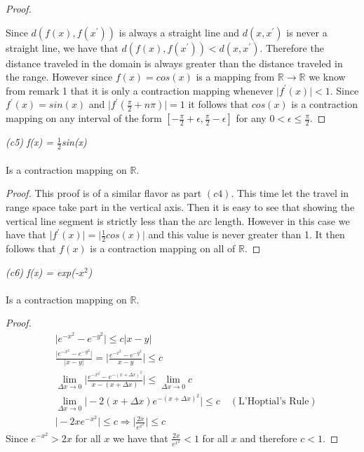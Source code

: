 \documentclass[12pt]{article}
\theoremstyle{remark}
\begin{document}
\begin{proof}
\begin{center}
 		\end{center}
 		Since $d(f(x),f(x^\prime))$ is always a straight line and $d(x,x^\prime)$ is never a straight line, we have that $d(f(x),f(x^\prime)) < d(x,x^\prime)$. Therefore the distance traveled in the domain is always greater than the distance traveled in the range. However since $f(x) = cos(x)$ is a mapping from $\mathbb{R} \rightarrow \mathbb{R}$ we know from remark 1 that it is only a contraction mapping whenever $\vert f^\prime(x) \vert < 1$. Since $f^\prime(x) = sin(x)$ and $\vert f^\prime(\frac{\pi}{2} + n\pi) \vert = 1$ it follows that $cos(x)$ is a contraction mapping on any interval of the form $[-\frac{\pi}{2} + \epsilon, \frac{\pi}{2} - \epsilon]$ for any $0 < \epsilon \leq \frac{\pi}{2}$.
 	\end{proof}
 	\noindent \textit{(c5) f(x) = $\frac{1}{2}$sin(x)} \\ \\
 	Is a contraction mapping on $\mathbb{R}$.
 	\begin{proof}
 		This proof is of a similar flavor as part $(c4)$. This time let the travel in range space take part in the vertical axis. Then it is easy to see that showing the vertical line segment is strictly less than the arc length. However in this case we have that $ \vert f^\prime(x) \vert = \vert \frac{1}{2}cos(x) \vert$ and this value is never greater than 1. It then follows that $f(x)$ is a contraction mapping on all of $\mathbb{R}$.
 	\end{proof}
 	
 	\newpage 
 	
 	\noindent \textit{(c6) f(x) = exp(-$x^2$)} \\ \\
 	Is a contraction mapping on $\mathbb{R}$.
 	\begin{proof}
 		\begin{align*}
 		& \vert e^{-x^2} - e^{-y^2} \vert \leq c \vert x - y \vert \\
 		& \frac{\vert e^{-x^2} - e^{-y^2} \vert}{\vert x - y \vert} = \Big\vert \frac{e^{-x^2} - e^{-y^2}}{x - y} \Big\vert \leq c \\
 		& \lim\limits_{\Delta x \rightarrow 0} \Big\vert \frac{e^{-x^2} - e^{-(x+\Delta x)^2}}{x - (x + \Delta x)} \Big\vert \leq \lim\limits_{\Delta x \rightarrow 0} c \\
 		& \lim\limits_{\Delta x \rightarrow 0} \vert -2(x + \Delta x)e^{-(x+\Delta x)^2} \vert \leq c \quad (\text{L'Hoptial's Rule}) \\
 		& \vert -2xe^{-x^2} \vert \leq c \Rightarrow \vert \frac{2x}{e^{x^2}} \vert \leq c 
 		\end{align*}
 		Since $e^{-x^2} > 2x$ for all $x$ we have that $\frac{2x}{e^{x^2}} < 1$ for all $x$ and therefore $c < 1$.
 	\end{proof}
 	
\end{document}
